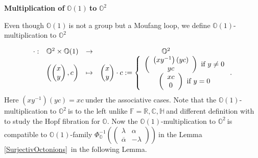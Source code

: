 \documentclass[a4paper]{article}%
\begin{document}
\bigskip

\begin{center}
\textbf{ Multiplication of }$\mathbb{O}(1)\ $\textbf{to }$\mathbb{O}^{2}$
\end{center}

Even though $\mathbb{O}(1)\ $is not a group but a Moufang loop, we define
$\mathbb{O}(1)$-multiplication to $\mathbb{O}^{2}\ $%

\[%
\begin{array}
[c]{cccc}%
\cdot: & \mathbb{O}^{2}\times\mathbb{O}(1) & \rightarrow & \mathbb{O}^{2}\\
& \left(
\begin{pmatrix}
x\\
y
\end{pmatrix}
,c\right)  & \mapsto &
\begin{pmatrix}
x\\
y
\end{pmatrix}
\cdot c:=\left\{
\begin{array}
[c]{c}%
\left(
\begin{array}
[c]{c}%
\left(  xy^{-1}\right)  \left(  yc\right) \\
yc
\end{array}
\right)  \ \text{if }y\neq0\\
\left(
\begin{array}
[c]{c}%
xc\\
0
\end{array}
\right)  \ \text{if }y=0
\end{array}
\right.  .
\end{array}
\]
Here $\left(  xy^{-1}\right)  \left(  yc\right)  =xc\ $under the associative
cases. Note that the $\mathbb{O}(1)$-multiplication to $\mathbb{O}^{2}\ $is to
the left unlike $\mathbb{F}=\mathbb{R},\mathbb{C},\mathbb{H\ }$and different
definition with \cite{Or} to study the Hopf fibration for $\mathbb{O}$. Now
the $\mathbb{O}(1)$-multiplication to $\mathbb{O}^{2}\ $is compatible to
$\mathbb{O}(1)$-family $\Phi_{\mathbb{O}}^{-1}\left(
\begin{pmatrix}
\lambda & \alpha\\
\overline{\alpha} & -\lambda
\end{pmatrix}
\right)  \ $in the Lemma \ref{SurjectivOctonions}\ in the following Lemma.
\end{document}
